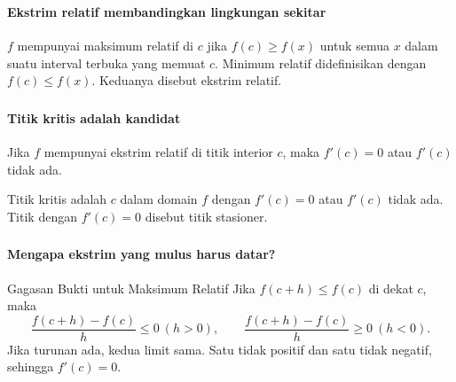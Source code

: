 \documentclass{../../kalkulus-ppt}
\begin{document}
\begin{frame}
\frametitle{\insertsection}
\framesubtitle{Ekstrim relatif membandingkan lingkungan sekitar}

\begin{definisi}
$f$ mempunyai maksimum relatif di $c$ jika $f(c)\ge f(x)$ untuk semua $x$ dalam suatu interval terbuka yang memuat $c$. Minimum relatif didefinisikan dengan $f(c)\le f(x)$. Keduanya disebut ekstrim relatif.
\end{definisi}
\end{frame}

\begin{frame}
\frametitle{\insertsection}
\framesubtitle{Titik kritis adalah kandidat}

\begin{teorema}
Jika $f$ mempunyai ekstrim relatif di titik interior $c$, maka $f'(c)=0$ atau $f'(c)$ tidak ada.
\end{teorema}
\begin{definisi}
Titik kritis adalah $c$ dalam domain $f$ dengan $f'(c)=0$ atau $f'(c)$ tidak ada. Titik dengan $f'(c)=0$ disebut titik stasioner.
\end{definisi}
\end{frame}

\begin{frame}
\frametitle{\insertsection}
\framesubtitle{Mengapa ekstrim yang mulus harus datar?}

\begin{block}{Gagasan Bukti untuk Maksimum Relatif}
Jika $f(c+h)\le f(c)$ di dekat $c$, maka
\[\frac{f(c+h)-f(c)}h\le0\ (h>0),\qquad
\frac{f(c+h)-f(c)}h\ge0\ (h<0).\]
Jika turunan ada, kedua limit sama. Satu tidak positif dan satu tidak negatif, sehingga $f'(c)=0$.
\end{block}
\end{frame}
\end{document}
